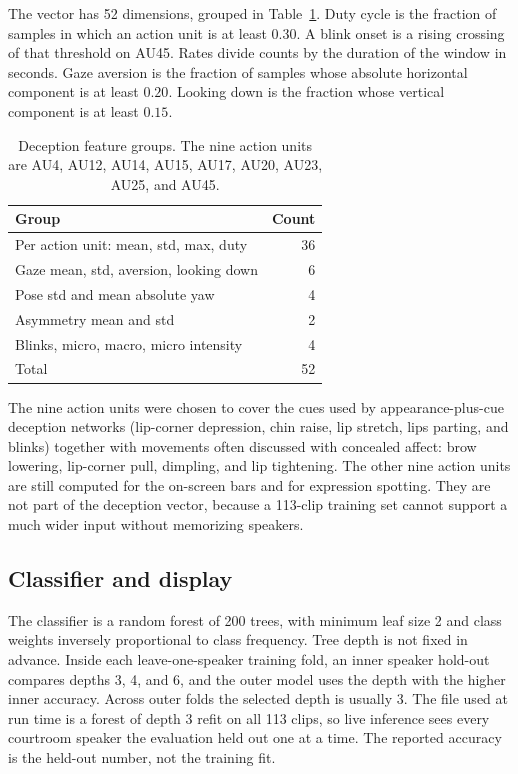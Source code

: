 \documentclass[conference]{IEEEtran}
\begin{document}
The vector has 52 dimensions, grouped in Table~\ref{tab:feats}. Duty cycle is the fraction of samples in which an action unit is at least $0.30$. A blink onset is a rising crossing of that threshold on AU45. Rates divide counts by the duration of the window in seconds. Gaze aversion is the fraction of samples whose absolute horizontal component is at least $0.20$. Looking down is the fraction whose vertical component is at least $0.15$.

\begin{table}[t]
\caption{Deception feature groups. The nine action units are AU4, AU12, AU14, AU15, AU17, AU20, AU23, AU25, and AU45.}
\label{tab:feats}
\centering
\begin{tabular}{lr}
\toprule
Group & Count \\
\midrule
Per action unit: mean, std, max, duty & 36 \\
Gaze mean, std, aversion, looking down & 6 \\
Pose std and mean absolute yaw & 4 \\
Asymmetry mean and std & 2 \\
Blinks, micro, macro, micro intensity & 4 \\
\midrule
Total & 52 \\
\bottomrule
\end{tabular}
\end{table}

The nine action units were chosen to cover the cues used by appearance-plus-cue deception networks (lip-corner depression, chin raise, lip stretch, lips parting, and blinks) together with movements often discussed with concealed affect: brow lowering, lip-corner pull, dimpling, and lip tightening. The other nine action units are still computed for the on-screen bars and for expression spotting. They are not part of the deception vector, because a 113-clip training set cannot support a much wider input without memorizing speakers.

\subsection{Classifier and display}
The classifier is a random forest of 200 trees, with minimum leaf size 2 and class weights inversely proportional to class frequency. Tree depth is not fixed in advance. Inside each leave-one-speaker training fold, an inner speaker hold-out compares depths 3, 4, and 6, and the outer model uses the depth with the higher inner accuracy. Across outer folds the selected depth is usually 3. The file used at run time is a forest of depth 3 refit on all 113 clips, so live inference sees every courtroom speaker the evaluation held out one at a time. The reported accuracy is the held-out number, not the training fit.
\end{document}
